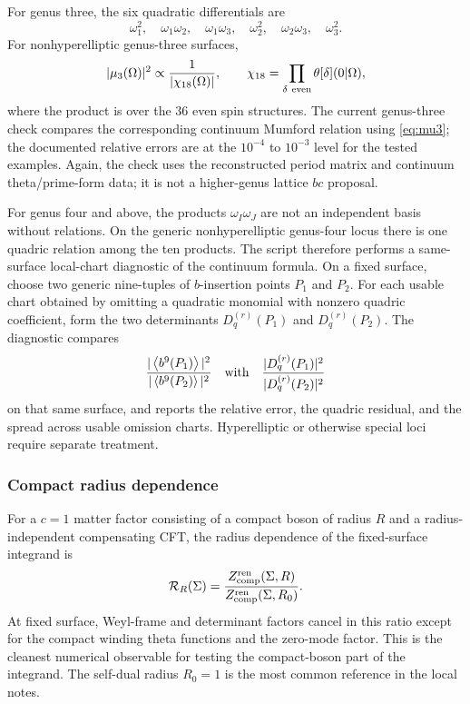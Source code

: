 \documentclass[11pt]{article}
\numberwithin{equation}{section}
\newcommand{\cR}{\mathcal R}
\newcommand{\vev}[1]{\left\langle #1\right\rangle}
\begin{document}
For genus three, the six quadratic differentials are
\[
        \omega_1^2,\quad \omega_1\omega_2,\quad \omega_1\omega_3,\quad
        \omega_2^2,\quad \omega_2\omega_3,\quad \omega_3^2.
\]
For nonhyperelliptic genus-three surfaces,
\begin{equation}
        |\mu_3(\Omega)|^2\propto \frac{1}{|\chi_{18}(\Omega)|},
        \qquad
        \chi_{18}=\prod_{\delta\ {\rm even}}\theta[\delta](0|\Omega),
        \label{eq:mu3}
\end{equation}
where the product is over the \(36\) even spin structures.  The current
genus-three check compares the corresponding continuum Mumford relation using
\eqref{eq:mu3}; the documented relative errors are at the \(10^{-4}\) to
\(10^{-3}\) level for the tested examples.  Again, the check uses the
reconstructed period matrix and continuum theta/prime-form data; it is not a
higher-genus lattice \(bc\) proposal.

For genus four and above, the products \(\omega_I\omega_J\) are not an
independent basis without relations.  On the generic nonhyperelliptic genus-four
locus there is one quadric relation among the ten products.  The script
 therefore performs a same-surface
local-chart diagnostic of the continuum formula.  On a fixed surface, choose
two generic nine-tuples of \(b\)-insertion points \(P_1\) and \(P_2\).  For each
usable chart obtained by omitting a quadratic monomial with nonzero quadric
coefficient, form the two determinants \(D_q^{(r)}(P_1)\) and
\(D_q^{(r)}(P_2)\).  The diagnostic compares
\[
        \frac{|\vev{b^9(P_1)}|^2}{|\vev{b^9(P_2)}|^2}
        \quad\hbox{with}\quad
        \frac{|D_q^{(r)}(P_1)|^2}{|D_q^{(r)}(P_2)|^2}
\]
on that same surface, and reports the relative error, the quadric residual, and
the spread across usable omission charts.  Hyperelliptic or otherwise special
loci require separate treatment.

\subsubsection{Compact radius dependence}

For a \(c=1\) matter factor consisting of a compact boson of radius \(R\) and a
radius-independent compensating CFT, the radius dependence of the fixed-surface
integrand is
\begin{equation}
        \cR_R(\Sigma)
        =
        \frac{Z_{\rm comp}^{\rm ren}(\Sigma,R)}
        {Z_{\rm comp}^{\rm ren}(\Sigma,R_0)}.
        \label{eq:radiusratio}
\end{equation}
At fixed surface, Weyl-frame and determinant factors cancel in this ratio
except for the compact winding theta functions and the zero-mode factor.  This
is the cleanest numerical observable for testing the compact-boson part of the
integrand.  The self-dual radius \(R_0=1\) is the most common reference in the
local notes.
\end{document}
